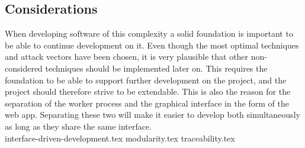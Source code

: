 \documentclass{article}
\begin{document}
\subsection{Considerations}
When developing software of this complexity a solid foundation is important to be able to continue development on it. Even though the most optimal techniques and attack vectors have been chosen, it is very plausible that other non-considered techniques should be implemented later on. This requires the foundation to be able to support further development on the project, and the project should therefore strive to be extendable. This is also the reason for the separation of the worker process and the graphical interface in the form of the web app. Separating these two will make it easier to develop both simultaneously as long as they share the same interface.
\\
{interface-driven-development.tex}
{modularity.tex}
{traceability.tex}
\end{document}
